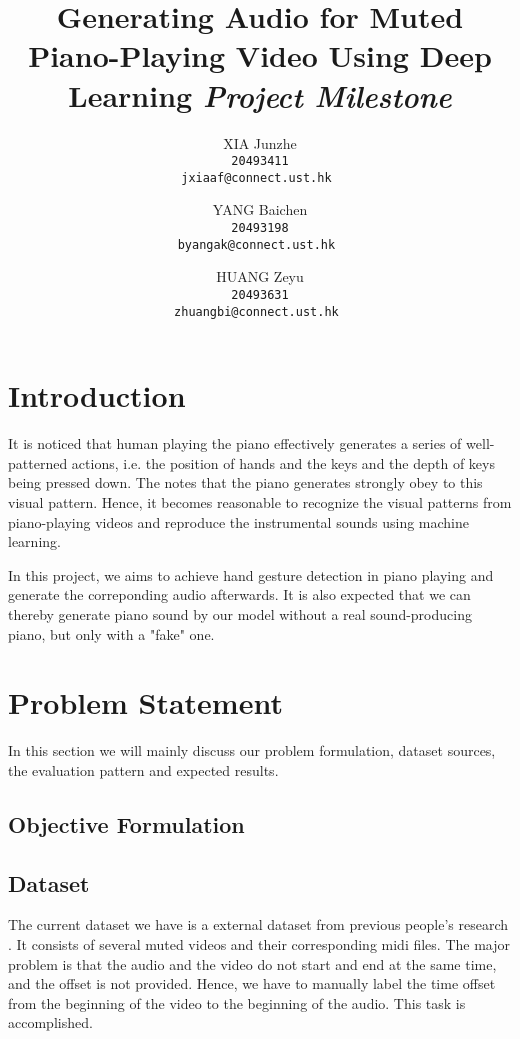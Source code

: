 \documentclass[10pt,twocolumn,letterpaper]{article}
\begin{document}
\title{Generating Audio for Muted Piano-Playing Video Using Deep Learning \newline \newline \textit{Project Milestone}}


\author{XIA Junzhe\\
\tt\small 20493411\\
{\tt\small jxiaaf@connect.ust.hk}
\and
YANG Baichen\\
\tt\small 20493198\\
{\tt\small byangak@connect.ust.hk}
\and
HUANG Zeyu\\
\tt\small 20493631\\
{\tt\small zhuangbi@connect.ust.hk}
}


\maketitle

\section{Introduction}
It is noticed that human playing the piano effectively generates a series of well-patterned actions, 
i.e. the position of hands and the keys and the depth of keys being pressed down. 
The notes that the piano generates strongly obey to this visual pattern. 
Hence, it becomes reasonable to recognize the visual patterns from piano-playing videos and reproduce the instrumental sounds using machine learning.

In this project, we aims to achieve hand gesture detection in piano playing and generate the correponding audio afterwards.
It is also expected that we can thereby generate piano sound by our model without a real sound-producing piano, but only with a "fake" one.

\section{Problem Statement}
In this section we will mainly discuss our problem formulation, dataset sources, the evaluation pattern and expected results.

    \subsection{Objective Formulation}

    \subsection{Dataset}
    The current dataset we have is a external dataset from previous people’s research \cite{Akbari}. 
    It consists of several muted videos and their corresponding midi files. 
    The major problem is that the audio and the video do not start and end at the same time, and the offset is not provided. 
    Hence, we have to manually label the time offset from the beginning of the video to the beginning of the audio. 
    This task is accomplished.
\end{document}

